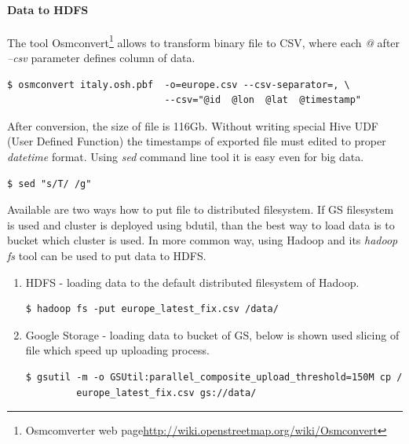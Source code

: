 \documentclass[a4paper,12pt,oneside]{report}
\begin{document}
\paragraph{Data to HDFS}
	 The tool Osmconvert\footnote{Osmcomverter web
	page\url{http://wiki.openstreetmap.org/wiki/Osmconvert}} allows to transform
	binary file to CSV,  where each 	\textit{@} after \textit{--csv} parameter
	defines column of data.
	\begin{footnotesize}
		\begin{lstlisting}[style=python]
$ osmconvert italy.osh.pbf  -o=europe.csv --csv-separator=, \
                            --csv="@id  @lon  @lat  @timestamp"
		\end{lstlisting}
	\end{footnotesize}
	 After conversion, the size of file is 116Gb. Without writing special Hive
	UDF (User Defined Function) the timestamps of exported file must edited to proper
	\textit{datetime} format. Using \textit{sed} command line tool it is easy even
	for big data.
	\begin{footnotesize}
		\begin{lstlisting}[style=python]
$ sed "s/T/ /g"
		\end{lstlisting}
	\end{footnotesize}
	 	Available are two ways how to put file to distributed filesystem. If GS
	filesystem is used and cluster is deployed using bdutil, than the best way to
	load data is to bucket which cluster is used. 
	In more common way, using Hadoop and
	its \textit{hadoop fs} tool can be used to put data to HDFS.
\begin{enumerate}
\item HDFS  - loading data to the default distributed filesystem of Hadoop.
	\begin{footnotesize}
		\begin{lstlisting}[style=python]
$ hadoop fs -put europe_latest_fix.csv /data/
		\end{lstlisting}
	\end{footnotesize}
\item Google Storage - loading data to bucket of GS, below is shown used slicing of
file which speed up uploading process.
	\begin{footnotesize}
		\begin{lstlisting}[style=python]
$ gsutil -m -o GSUtil:parallel_composite_upload_threshold=150M cp /
		 europe_latest_fix.csv gs://data/
		\end{lstlisting}
	\end{footnotesize}
\end{enumerate}
\end{document}
